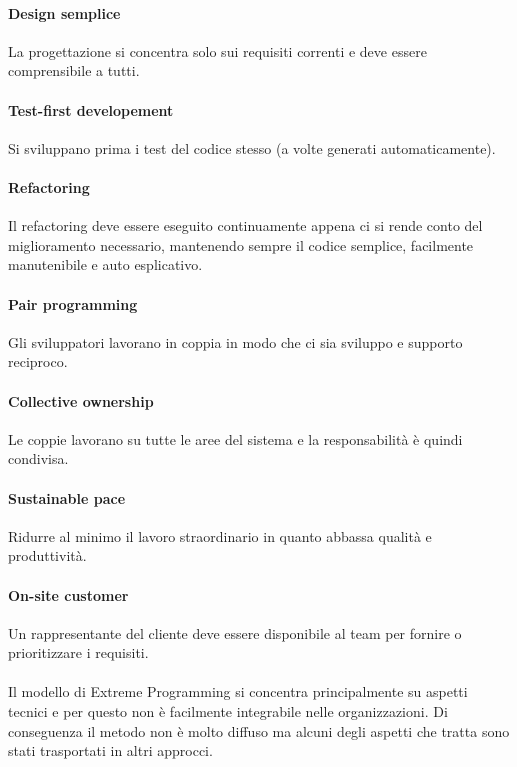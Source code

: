 \paragraph{Design semplice} La progettazione si concentra solo sui requisiti correnti e deve essere comprensibile a tutti.
\paragraph{Test-first developement} Si sviluppano prima i test del codice stesso (a volte generati automaticamente).
\paragraph{Refactoring} Il refactoring deve essere eseguito continuamente appena ci si rende conto del miglioramento necessario, mantenendo sempre il codice semplice, facilmente manutenibile e auto esplicativo.
\paragraph{Pair programming} Gli sviluppatori lavorano in coppia in modo che ci sia sviluppo e supporto reciproco.
\paragraph{Collective ownership} Le coppie lavorano su tutte le aree del sistema e la responsabilità è quindi condivisa.
\paragraph{Sustainable pace} Ridurre al minimo il lavoro straordinario in quanto abbassa qualità e produttività.
\paragraph{On-site customer} Un rappresentante del cliente deve essere disponibile al team per fornire o prioritizzare i requisiti.\\\\

Il modello di Extreme Programming si concentra principalmente su aspetti tecnici e per questo non è facilmente integrabile nelle organizzazioni. Di conseguenza il metodo non è molto diffuso ma alcuni degli aspetti che tratta sono stati trasportati in altri approcci.

